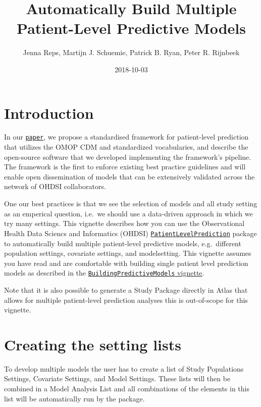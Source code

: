 \documentclass[]{article}
\title{Automatically Build Multiple Patient-Level Predictive Models}
\author{Jenna Reps, Martijn J. Schuemie, Patrick B. Ryan, Peter R. Rijnbeek}
\date{2018-10-03}
\begin{document}
\maketitle

{
\setcounter{tocdepth}{2}
\tableofcontents
}
\section{Introduction}\label{introduction}

In our
\href{https://academic.oup.com/jamia/article/25/8/969/4989437}{\texttt{paper}},
we propose a standardised framework for patient-level prediction that
utilizes the OMOP CDM and standardized vocabularies, and describe the
open-source software that we developed implementing the framework's
pipeline. The framework is the first to enforce existing best practice
guidelines and will enable open dissemination of models that can be
extensively validated across the network of OHDSI collaborators.

One our best practices is that we see the selection of models and all
study setting as an emperical question, i.e.~we should use a data-driven
approach in which we try many settings. This vignette describes how you
can use the Observational Health Data Sciencs and Informatics (OHDSI)
\href{http://github.com/OHDSI/PatientLevelPrediction}{\texttt{PatientLevelPrediction}}
package to automatically build multiple patient-level predictive models,
e.g.~different population settings, covariate settings, and
modelsetting. This vignette assumes you have read and are comfortable
with building single patient level prediction models as described in the
\href{https://github.com/OHDSI/PatientLevelPrediction/blob/master/inst/doc/BuildingPredictiveModels.pdf}{\texttt{BuildingPredictiveModels}
vignette}.

Note that it is also possible to generate a Study Package directly in
Atlas that allows for multiple patient-level prediction analyses this is
out-of-scope for this vignette.

\section{Creating the setting lists}\label{creating-the-setting-lists}

To develop multiple models the user has to create a list of Study
Populations Settings, Covariate Settings, and Model Settings. These
lists will then be combined in a Model Analysis List and all
combinations of the elements in this list will be automatically run by
the package.
\end{document}
